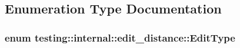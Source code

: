 \subsection{Enumeration Type Documentation}
\subsubsection[{\texorpdfstring{Edit\+Type}{EditType}}]{\setlength{\rightskip}{0pt plus 5cm}enum {\bf testing\+::internal\+::edit\+\_\+distance\+::\+Edit\+Type}}\hypertarget{namespacetesting_1_1internal_1_1edit__distance_ad46aa6da12aec1a3f166310478b53a08}{}\label{namespacetesting_1_1internal_1_1edit__distance_ad46aa6da12aec1a3f166310478b53a08}
